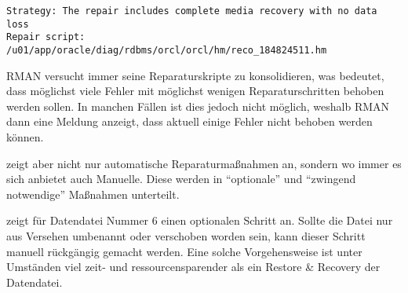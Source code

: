         \begin{lstlisting}[caption={Das Reparaturskript},label=admin1540,language=rman]
Strategy: The repair includes complete media recovery with no data loss
Repair script: /u01/app/oracle/diag/rdbms/orcl/orcl/hm/reco_184824511.hm
        \end{lstlisting}
        \begin{merke}
          RMAN versucht immer seine Reparaturskripte zu konsolidieren, was bedeutet, dass m\"oglichst viele Fehler mit m\"oglichst wenigen Reparaturschritten behoben werden sollen. In manchen F\"allen ist dies jedoch nicht m\"oglich, weshalb RMAN dann eine Meldung anzeigt, dass aktuell einige Fehler nicht behoben werden k\"onnen.
        \end{merke}
         zeigt aber nicht nur automatische Reparaturma\ss{}nahmen an, sondern wo immer es sich anbietet auch Manuelle. Diese werden in \enquote{optionale} und \enquote{zwingend notwendige} Ma\ss{}nahmen unterteilt.

         zeigt f\"ur Datendatei Nummer 6 einen optionalen Schritt an. Sollte die Datei nur aus Versehen umbenannt oder verschoben worden sein, kann dieser Schritt manuell r\"uckg\"angig gemacht werden. Eine solche Vorgehensweise ist unter Umst\"anden viel zeit- und ressourcensparender als ein Restore \& Recovery der Datendatei.

